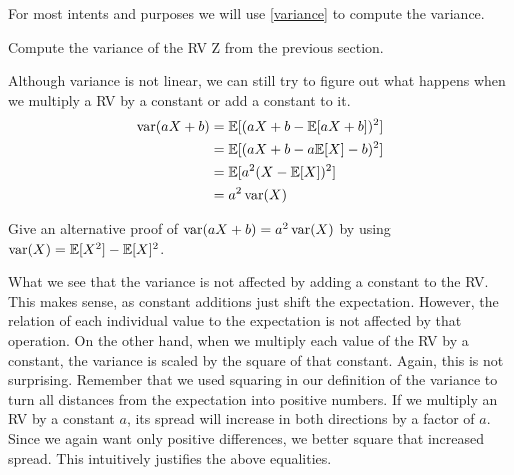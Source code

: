For most intents and purposes we will use \eqref{variance} to compute the variance. 


\begin{Exercise}
Compute the variance of the RV Z from the previous section.
\end{Exercise}

Although variance is not linear, we can still try to figure out what happens when we multiply a RV by a constant or add a constant to it.
\begin{align}
\operatorname{var}(aX+b) &= \mathbb{E}[ (aX+b - \mathbb{E}[aX+b])^2 ] \\
&=\mathbb{E}[ (aX+b - a\mathbb{E}[X] - b)^2 ] \\
&=\mathbb{E}[ a^2 (X-\mathbb{E}[X])^2 ] \\
&= a^2 \operatorname{var}(X)
\end{align}

\begin{Exercise}
Give an alternative proof of $\operatorname{var}(aX+b) = a^2 \operatorname{var}(X)$ by using $\operatorname{var}(X)
= \mathbb{E}[X^{2}] - \mathbb{E}[X]^{2}$.
\end{Exercise}

What we see that the variance is not affected by adding a constant to the RV. This makes sense, as constant additions just shift
the expectation. However, the relation of each individual value to the expectation is not affected by that operation. On the other hand,
when we multiply each value of the RV by a constant, the variance is scaled by the square of that constant. Again, this is not surprising.
Remember that we used squaring in our definition of the variance to turn all distances from the expectation into positive numbers.
If we multiply an RV by a constant $ a $, its spread will increase in both directions by a factor of $ a $. 
Since we again want only positive differences,
we better square that increased spread. This intuitively justifies the above equalities.


